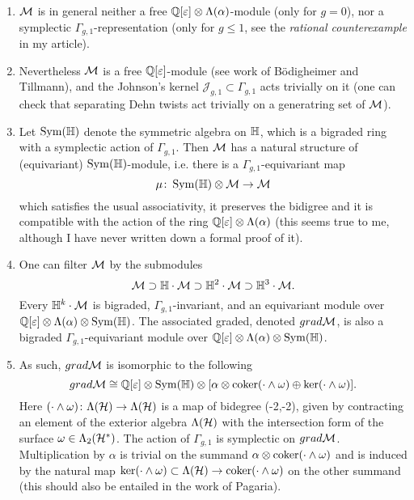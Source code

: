 \documentclass{amsart}
\theoremstyle{plain}
\theoremstyle{definition}
\begin{document}
\begin{enumerate}
 \item $\mathcal{M}$ is in general neither a free $\mathbb{Q}[\varepsilon]\otimes \Lambda (\alpha)$-module (only for $g=0$),
 nor a symplectic $\Gamma_{g,1}$-representation (only for $g\leq 1$, see the \emph{rational counterexample}
 in my article).
 \item Nevertheless $\mathcal{M}$ is a free $\mathbb{Q}[\varepsilon]$-module (see work of B\"odigheimer and Tillmann), and the Johnson's kernel
 $\mathcal{J}_{g,1}\subset\Gamma_{g,1}$ acts trivially on it (one can check that
 separating Dehn twists act trivially on a generatring set of $\mathcal{M}$).
 \item Let $\operatorname{Sym}(\mathbb{H})$ denote the symmetric algebra on $\mathbb{H}$, which is a bigraded ring with a
 symplectic action of $\Gamma_{g,1}$. Then $\mathcal{M}$ has a natural structure of (equivariant)
 $\operatorname{Sym}(\mathbb{H})$-module, i.e. there is a $\Gamma_{g,1}$-equivariant map
 \[
  \mu\colon\operatorname{Sym}(\mathbb{H})\otimes \mathcal{M}\to \mathcal{M}
 \]
 which satisfies the usual associativity, it preserves the bidigree and it is compatible with
 the action of the ring $\mathbb{Q}[\varepsilon]\otimes \Lambda (\alpha)$ (this seems true to me, although
 I have never written down a formal proof of it).
 \item One can filter $\mathcal{M}$ by the submodules
 \[
  \mathcal{M}\supset\mathbb{H}\cdot\mathcal{M}\supset\mathbb{H}^2\cdot\mathcal{M}\supset\mathbb{H}^3\cdot \mathcal{M}.
 \]
 Every $\mathbb{H}^k\cdot\mathcal{M}$ is bigraded, $\Gamma_{g,1}$-invariant, and an equivariant module
 over $\mathbb{Q}[\varepsilon]\otimes \Lambda (\alpha)\otimes \operatorname{Sym}(\mathbb{H})$. The associated graded,
 denoted $grad\mathcal{M}$, is also a bigraded $\Gamma_{g,1}$-equivariant module over $\mathbb{Q}[\varepsilon]\otimes \Lambda (\alpha)\otimes \operatorname{Sym}(\mathbb{H})$.
 \item As such, $grad\mathcal{M}$ is isomorphic to the following
 \[
  grad\mathcal{M}\cong \mathbb{Q}[\varepsilon]\otimes \operatorname{Sym}(\mathbb{H})\otimes [\alpha\otimes\operatorname{coker}(\cdot\wedge\omega)\oplus\operatorname{ker}(\cdot\wedge\omega)].
 \]
 Here $(\cdot\wedge\omega)\colon\Lambda(\mathcal{H})\to\Lambda(\mathcal{H})$ is a map of bidegree (-2,-2), given by contracting
 an element of the exterior algebra $\Lambda(\mathcal{H})$ with the intersection form of the surface $\omega\in\Lambda_2(\mathcal{H}^*)$.
 The action of $\Gamma_{g,1}$ is symplectic on $grad\mathcal{M}$. Multiplication by $\alpha$ is trivial on the summand
 $\alpha\otimes\operatorname{coker}(\cdot\wedge\omega)$ and is induced by the natural map
 $\operatorname{ker}(\cdot\wedge\omega)\subset \Lambda(\mathcal{H})\to\operatorname{coker}(\cdot\wedge\omega)$ on the other summand (this should
 also be entailed in the work of Pagaria).
\end{enumerate}
\end{document}
